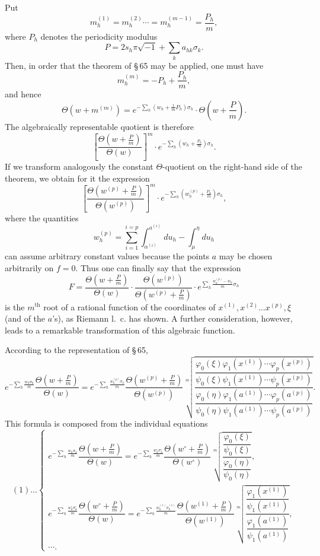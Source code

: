 \documentclass[10pt]{article}
\begin{document}
Put
\[
m_h^{(1)}=m_h^{(2)}\cdots=m_h^{(m-1)}=\frac{P_h}{m},
\]
where \(P_h\) denotes the periodicity modulus
\[
P=2s_h\pi\sqrt{-1}+\sum_k a_{hk}\sigma_k.
\]
Then, in order that the theorem of \S\,65 may be applied, one must have
\[
m_h^{(m)}=-P_h+\frac{P_h}{m},
\]
and hence
\[
\Theta(w+m^{(m)})=
e^{-\sum_h\left(w_h+\frac1mP_h\right)\sigma_h}
\cdot\Theta\left(w+\frac Pm\right).
\]
The algebraically representable quotient is therefore
\[
\left[\frac{\Theta\left(w+\frac Pm\right)}{\Theta(w)}\right]^m
\cdot
e^{-\sum_h\left(w_h+\frac{P_h}{m}\right)\sigma_h}.
\]
If we transform analogously the constant \(\Theta\)-quotient on the right-hand side of the theorem, we obtain for it the expression
\[
\left[\frac{\Theta\left(w^{(p)}+\frac Pm\right)}{\Theta(w^{(p)})}\right]^m
\cdot
e^{-\sum_h\left(w_h^{(p)}+\frac{P_h}{m}\right)\sigma_h},
\]
where the quantities
\[
w_h^{(p)}=\sum_{i=1}^{i=p}\int_{\alpha^{(i)}}^{a^{(i)}}du_h-\int_{\mu}^{\eta}du_h
\]
can assume arbitrary constant values because the points \(a\) may be chosen arbitrarily on \(f=0\). Thus one can finally say that the expression
\[
F=
\frac{\Theta\left(w+\frac Pm\right)}{\Theta(w)}
\cdot
\frac{\Theta(w^{(p)})}{\Theta\left(w^{(p)}+\frac Pm\right)}
\cdot
e^{\sum_h\frac{w_h^{(p)}-w_h}{m}\sigma_h}
\]
is the \(m^{\text{th}}\) root of a rational function of the coordinates of \(x^{(1)},x^{(2)}\ldots x^{(p)},\xi\) (and of the \(a\)'s), as Riemann l.~c. has shown. A further consideration, however, leads to a remarkable transformation of this algebraic function.

According to the representation of \S\,65,
\[
e^{-\sum_h\frac{w_h\sigma_h}{m}}
\frac{\Theta\left(w+\frac Pm\right)}{\Theta(w)}
=
e^{-\sum_h\frac{w_h^{(p)}\sigma_h}{m}}
\frac{\Theta\left(w^{(p)}+\frac Pm\right)}{\Theta(w^{(p)})}
\sqrt[m]{
\frac{
\dfrac{\varphi_0(\xi)\varphi_1(x^{(1)})\cdots\varphi_p(x^{(p)})}
      {\psi_0(\xi)\psi_1(x^{(1)})\cdots\psi_p(x^{(p)})}
}{
\dfrac{\varphi_0(\eta)\varphi_1(a^{(1)})\cdots\varphi_p(a^{(p)})}
      {\psi_0(\eta)\psi_1(a^{(1)})\cdots\psi_p(a^{(p)})}
}
}.
\]
This formula is composed from the individual equations
\[
(1)\ldots
\begin{cases}
e^{-\sum_h\frac{w_h\sigma_h}{m}}
\dfrac{\Theta\left(w+\frac Pm\right)}{\Theta(w)}
=
e^{-\sum_h\frac{w_h^\circ\sigma_h^\circ}{m}}
\dfrac{\Theta\left(w^\circ+\frac Pm\right)}{\Theta(w^\circ)}
\sqrt[m]{\dfrac{\dfrac{\varphi_0(\xi)}{\psi_0(\xi)}}{\dfrac{\varphi_0(\eta)}{\psi_0(\eta)}}},\\[1.0em]
e^{-\sum_h\frac{w_h^\circ\sigma_h^\circ}{m}}
\dfrac{\Theta\left(w^\circ+\frac Pm\right)}{\Theta(w)}
=
e^{-\sum_h\frac{w_h^{(1)}\sigma_h^{(1)}}{m}}
\dfrac{\Theta\left(w^{(1)}+\frac Pm\right)}{\Theta(w^{(1)})}
\sqrt[m]{\dfrac{\dfrac{\varphi_1(x^{(1)})}{\psi_1(x^{(1)})}}{\dfrac{\varphi_1(a^{(1)})}{\psi_1(a^{(1)})}}},\\
\cdots.
\end{cases}
\]
\end{document}
